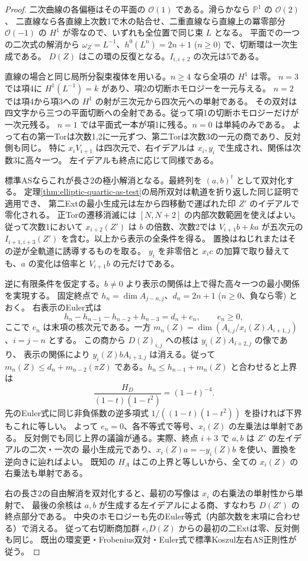 \begin{proof}
二次曲線の各偏極はその平面の $\mathcal O(1)$ である。滑らかなら $\mathbb P^1$ の $\mathcal O(2)$、
二直線なら各直線上次数1で木の貼合せ、二重直線なら直線上の冪零部分 $\mathcal O(-1)$ の
$H^1$ が零なので、いずれも全位置で同じ束 $L$ となる。
平面での一つの二次式の解消から
$\omega_Z=L^{-1}$、$h^0(L^n)=2n+1$ ($n\ge0$) で、切断環は一次生成である。
$D(Z)$ はこの環の反復となる。$I_{i,i+2}$ の次元は5である。

直線の場合と同じ局所分裂束複体を用いる。$n\ge4$ なら全項の $H^1$ は零。
$n=3$ では項4に $H^1(L^{-1})=k$ があり、項2の切断ホモロジーを一元与える。
$n=2$ では項4から項3への $H^1$ の射が三次元から四次元への単射である。
その双対は四文字から三つの平面切断への全射である。従って項1の切断ホモロジーだけが一次元残る。
$n=1$ では平面式一本が項1に残る。$n=0$ は単純のみである。
よって右の第一Torは次数1,2に一元ずつ、第二Torは次数3の一元の商であり、反対側も同じ。
特に $x_i V_{i+1}$ は四次元で、右イデアルは $x_i,y_i$ で生成され、関係は次数3に高々一つ。
左イデアルも終点に応じて同様である。

標準ASならこれが長さ2の極小解消となる。最終列を $(a,b)^t$ として双対化する。
定理\ref{thm:elliptic-quartic-as-test}の局所双対は軌道を折り返した同じ証明で適用でき、
第二Extの最小生成元は左から四移動で運ばれた印 $Z'$ のイデアルで零化される。
正Torの遷移消滅には $[N,N+2]$ の内部次数範囲を使えばよい。
従って次数1において $x_{i+2}(Z')$ は $b$ の倍数、次数2では
$V_{i+1}b+k a$ が五次元の $I_{i+1,i+3}(Z')$ を含む。以上から表示の全条件を得る。
置換はねじれまたはその逆が全軌道に誘導するものを取る。
$y_i$ を非零倍と $x_i c$ の加算で取り替えても、$a$ の変化は倍率と $V_{i+1}b$ の元だけである。

逆に有限条件を仮定する。$b\ne0$ より表示の関係は上で得た高々一つの最小関係を実現する。
固定終点で $h_n=\dim A_{j-n,j}$、$d_n=2n+1$ ($n\ge0$、負なら零) とおく。
右表示のEuler式は
\[
 h_n-h_{n-1}-h_{n-2}+h_{n-3}=d_n+e_n,\qquad e_n\ge0 ,
\]
ここで $e_n$ は末項の核次元である。一方 $m_n(Z)=\dim(A_{i,j}/x_i(Z)A_{i+1,j})$、$i=j-n$ とする。
この商から $D(Z)_{i,j}$ への核は $y_i(Z)A_{i+2,j}$ の像であり、
表示の関係により $y_i(Z)b A_{i+3,j}$ は消える。従って
$m_n(Z)\le d_n+m_{n-2}(\pi Z)$ である。$h_n\le h_{n-1}+m_n(Z)$ と合わせると上界は
\[
 \frac{H_D}{(1-t)(1-t^2)}=(1-t)^{-4}.
\]
先のEuler式に同じ非負係数の逆多項式 $1/((1-t)(1-t^2))$ を掛ければ下界もこれに等しい。
よって $e_n=0$、各不等式で等号、$x_i(Z)$ の左乗法は単射である。
反対側でも同じ上界の議論が通る。実際、終点 $i+3$ で $a,b$ は $Z'$ の左イデアルの二次・一次の
最小生成元であり、$x_i(Z) a=-y_i(Z)b$ を使い、置換を逆向きに辿ればよい。
既知の $H_A$ はこの上界と等しいから、全ての $x_i(Z)$ の右乗法も単射である。

右の長さ2の自由解消を双対化すると、最初の写像は $x_i$ の右乗法の単射性から単射で、
最後の余核は $a,b$ が生成する左イデアルによる商、すなわち $D(Z')$ の終点部分である。
中央のホモロジーも先のEuler等式（内部次数を末項に合わせる）で消える。
従って右切断商加群 $e_iD(Z)$ からの最初の二Extは零、反対側も同じ。
既出の環変更・Frobenius双対・Euler式で標準Koszul左右AS正則性が従う。
\end{proof}

